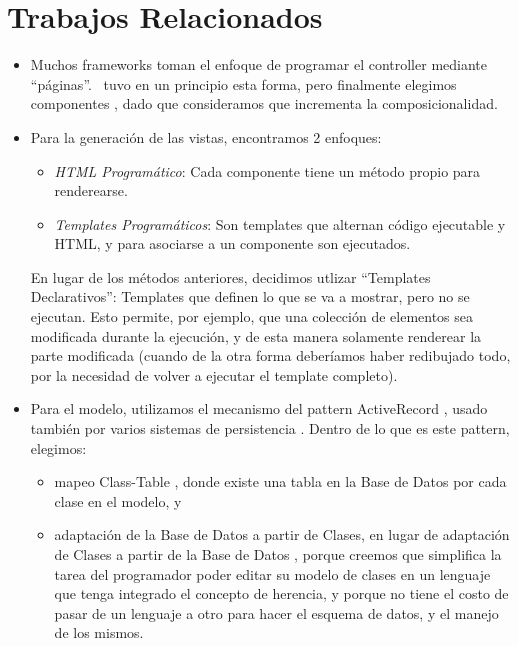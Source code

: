 \section{Trabajos Relacionados}

\begin{itemize}
\item Muchos frameworks toman el enfoque de programar el controller mediante ``páginas''\cite{cake, RoR}. \PWB\ tuvo en un principio esta forma, pero finalmente elegimos componentes \cite{seaside,Duca04e}, dado que consideramos que incrementa la composicionalidad.


\item Para la generación de las vistas, encontramos 2 enfoques:
\begin{itemize}
\item \emph{HTML Programático}: Cada componente tiene un método propio para renderearse.
\item \emph{Templates Programáticos}: Son templates que alternan código ejecutable y HTML, y para asociarse a un componente son ejecutados.
\end{itemize}
En lugar de los métodos anteriores, decidimos utlizar ``Templates Declarativos'': Templates que definen lo que se va a mostrar, pero no se ejecutan. Esto permite, por ejemplo, que una colección de elementos sea modificada durante la ejecución, y de esta manera solamente renderear la parte modificada (cuando de la otra forma deberíamos haber redibujado todo, por la necesidad de volver a ejecutar el template completo).


\item Para el modelo, utilizamos el mecanismo del pattern ActiveRecord \cite{activerecord}, usado también por varios sistemas de persistencia \cite{cake, RoR, hibernate, glorp}. Dentro de lo que es este pattern, elegimos:
\begin{itemize}
\item mapeo Class-Table \cite{classtable}, donde existe una tabla en la Base de Datos por cada clase en el modelo, y
\item adaptación de la Base de Datos a partir de Clases, en lugar de adaptación de Clases a partir de la Base de Datos \cite{cake, RoR}, porque creemos que simplifica la tarea del programador poder editar su modelo de clases en un lenguaje que tenga integrado el concepto de herencia, y porque no tiene el costo de pasar de un lenguaje a otro para hacer el esquema de datos, y el manejo de los mismos.
\end{itemize}


\end{itemize}
